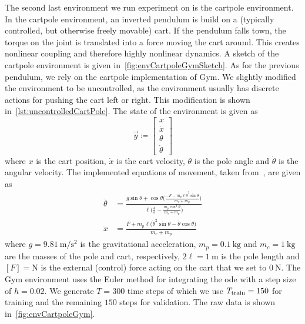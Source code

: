 		The second last environment we run experiment on is the cartpole environment. In the cartpole environment, an inverted pendulum is build on a (typically controlled, but otherwise freely movable) cart. If the pendulum falls town, the torque on the joint is translated into a force moving the cart around. This creates nonlinear coupling and therefore highly nonlinear dynamics. A sketch of the cartpole environment is given in~\autoref{fig:envCartpoleGymSketch}. As for the previous pendulum, we rely on the cartpole implementation of Gym. We slightly modified the environment to be uncontrolled, as the environment usually has discrete actions for pushing the cart left or right. This modification is shown in~\autoref{lst:uncontrolledCartPole}. The state of the environment is given as
		\begin{equation*}
			\vec{y} \coloneqq
				\begin{bmatrix}
					x \\
					\dot{x} \\
					\theta \\
					\dot{\theta}
				\end{bmatrix}
		\end{equation*}
		where \(x\) is the cart position, \(\dot{x}\) is the cart velocity, \(\theta\) is the pole angle and \(\dot{\theta}\) is the angular velocity. The implemented equations of movement, taken from~\cite{florianCorrectEquationsDynamics2005}, are given as
		\begin{align*}
			\ddot{\theta} &= \frac{g \sin\theta + \cos\theta \Big(\! \frac{-F - m_p \ell \dot{\theta}^2 \sin\theta}{m_c + m_p} \!\Big)}{\ell \Big(\! \frac{4}{3} - \frac{m_p \cos^2\theta}{m_c + m_p} \!\Big)} \\
			\ddot{x} &= \frac{F + m_p \ell \big( \dot{\theta}^2 \sin\theta - \ddot{\theta} \cos\theta \big)}{m_c + m_p}
		\end{align*}
		where \( g = \SI{9.81}{\meter\per\second\squared} \) is the gravitational acceleration, \( m_p = \SI{0.1}{\kilogram} \) and \( m_c = \SI{1}{\kilogram} \) are the masses of the pole and cart, respectively, \( 2\ell = \SI{1}{\meter} \) is the pole length and \( [F] = \si{\newton} \) is the external (control) force acting on the cart that we set to \( \SI{0}{\newton} \). The Gym environment uses the Euler method for integrating the \ac{ode} with a step size of \( h = 0.02 \). We generate \( T = 300 \) time steps of which we use \( T_{\mathrm{train}} = 150 \) for training and the remaining \(150\) steps for validation. The raw data is shown in~\autoref{fig:envCartpoleGym}.

